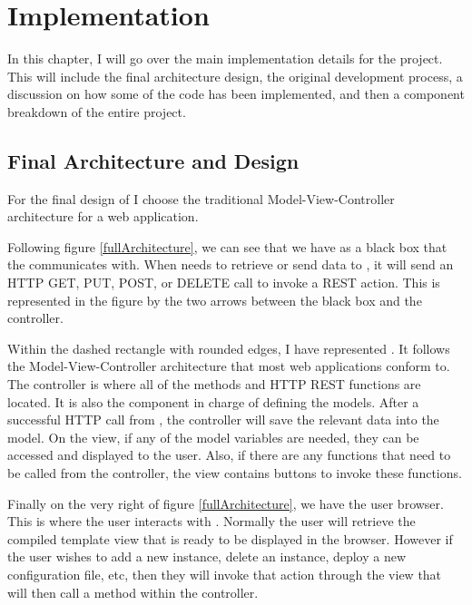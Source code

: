 
\cleardoublepage

\chapter{\projectName{} Implementation}
\label{makereference3}

In this chapter, I will go over the main implementation details for the project. This will include the final architecture design, the original development process, a discussion on how some of the code has been implemented, and then a component breakdown of the entire project.

\section{Final Architecture and Design}
\label{makereference3.1}

For the final design of \projectName{} I choose the traditional Model-View-Controller architecture for a web application.

Following figure \ref{fullArchitecture}, we can see that we have \ancor{} as a black box that the \projectName{} communicates with. When \projectName{} needs to retrieve or send data to \ancor{}, it will send an HTTP GET, PUT, POST, or DELETE call to invoke a REST action. This is represented in the figure by the two arrows between the \ancor{} black box and the controller.

Within the dashed rectangle with rounded edges, I have represented \projectName{}. It follows the Model-View-Controller architecture that most web applications conform to. The controller is where all of the methods and HTTP REST functions are located. It is also the component in charge of defining the models. After a successful HTTP call from \ancor{}, the controller will save the relevant data into the model. On the view, if any of the model variables are needed, they can be accessed and displayed to the user. Also, if there are any functions that need to be called from the controller, the view contains buttons to invoke these functions.

Finally on the very right of figure \ref{fullArchitecture}, we have the user browser. This is where the user interacts with \projectName{}. Normally the user will retrieve the compiled template view that is ready to be displayed in the browser. However if the user wishes to add a new instance, delete an instance, deploy a new configuration file, etc, then they will invoke that action through the view that will then call a method within the controller.

